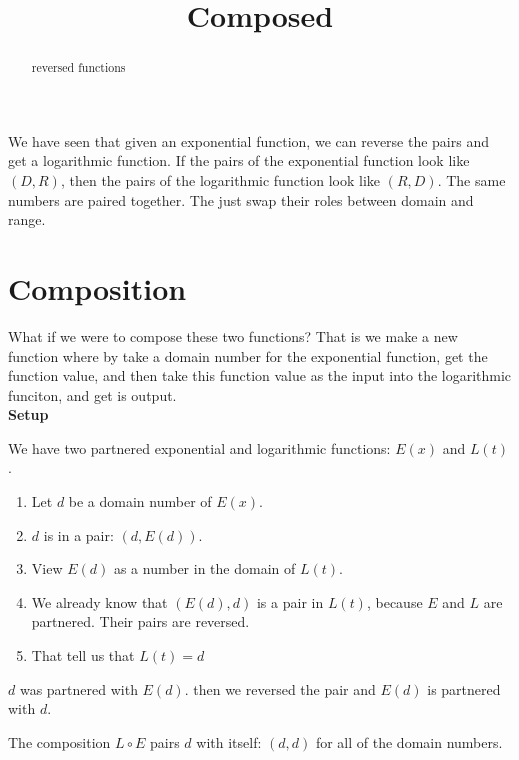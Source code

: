 \documentclass{ximera}
\title{Composed}
\begin{document}
\begin{abstract}
reversed functions
\end{abstract}
\maketitle







We have seen that given an exponential function, we can reverse the pairs and get a logarithmic function.  If the pairs of the exponential function look like $(D,R)$, then the pairs of the logarithmic function look like $(R,D)$.  The same numbers are paired together.  The just swap their roles between domain and range.

\section{Composition}

What if we were to compose these two functions?  That is we make a new function where by take a domain number for the exponential function, get the function value, and then take this function value as the input into the logarithmic funciton, and get is output. \\





\textbf{Setup}

We have two partnered exponential and logarithmic functions: $E(x)$ and $L(t)$.  \\

\begin{enumerate}
\item Let $d$ be a domain number of $E(x)$.
\item $d$ is in a pair: $(d, E(d))$.
\item View $E(d)$ as a number in the domain of $L(t)$.
\item We already know that $(E(d),d)$ is a pair in $L(t)$, because $E$ and $L$ are partnered.  Their pairs are reversed.
\item That tell us that $L(t)=d$
\end{enumerate}



$d$ was partnered with $E(d)$.  then we reversed the pair and $E(d)$ is partnered with $d$.

The composition $L \circ E$ pairs $d$ with itself: $(d,d)$ for all of the domain numbers. \\
\end{document}
